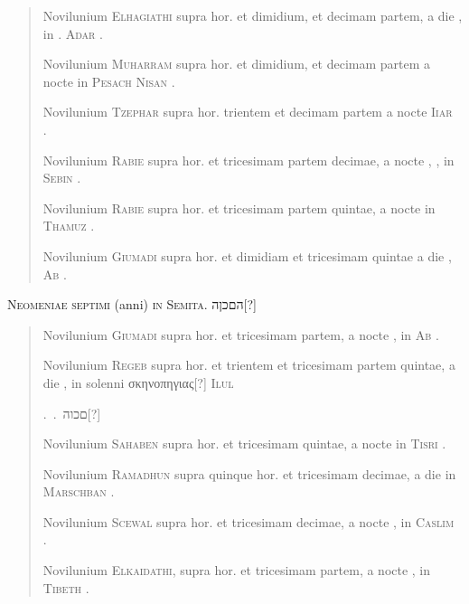 \begin{quotation}
Novilunium \textsc{Elhagiathi} supra  hor. et dimidium, et decimam 
partem, a die ,  in . \textsc{Adar} 
\hfill {}.~

Novilunium \textsc{Muharram} supra  hor. et dimidium, et decimam 
partem a nocte  in \textsc{Pesach}  \textsc{Nisan} 
\hfill {}.~

Novilunium \textsc{Tzephar} supra  hor. trientem et decimam 
partem a nocte  \textsc{Iiar} 
\hfill {}.~

Novilunium \textsc{Rabie} supra  hor. et tricesimam partem decimae, 
a nocte , , in  \textsc{Sebin} 
\hfill {}.~

Novilunium \textsc{Rabie} supra  hor. et tricesimam partem quintae, 
a nocte  in  \textsc{Thamuz} 
\hfill {}.~

Novilunium \textsc{Giumadi} supra  hor. et dimidiam et tricesimam 
quintae a die ,  \textsc{Ab} 
\hfill {}.~
\end{quotation}

%
\begin{center}
\large\textsc{Neomeniae septimi} (anni) \textsc{in Semita.}
 \texthebrew{הםכןה}[?]\\
\end{center}

\begin{quotation}
Novilunium \textsc{Giumadi} supra  hor. et tricesimam partem,
a nocte , in  \textsc{Ab}
\hfill {}.~

Novilunium \textsc{Regeb} supra  hor. et trientem et tricesimam
partem quintae, a die ,  in solenni
\textgreek{σκηνοπηγιας[?]}  \textsc{Ilul}
\par
\hfill {}.~.~\texthebrew{םכוה}[?]

Novilunium \textsc{Sahaben} supra  hor. et tricesimam quintae,
a nocte in  \textsc{Tisri}
\hfill {}.~

Novilunium \textsc{Ramadhun} supra quinque hor. et tricesimam decimae,
a die  in  \textsc{Marschban}
\hfill {}.~

Novilunium \textsc{Scewal} supra  hor. et tricesimam decimae,
a nocte , in  \textsc{Caslim}
\hfill {}.~

Novilunium \textsc{Elkaidathi}, supra  hor. et tricesimam
partem, a nocte , in  \textsc{Tibeth}
\hfill {}.~

\end{quotation}

